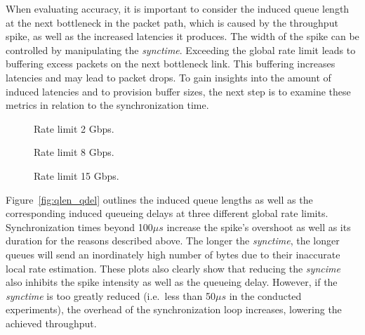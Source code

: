 %
When evaluating accuracy, it is important to consider the induced queue length at the next bottleneck in the packet path, which is caused by the throughput spike, as well as the increased latencies it produces.
%
The width of the spike can be controlled by manipulating the \textit{synctime}.
%
Exceeding the global rate limit leads to buffering excess packets on the next bottleneck link.
%
This buffering increases latencies and may lead to packet drops.
%
To gain insights into the amount of induced latencies and to provision buffer sizes, the next step is to examine these metrics in relation to the synchronization time. 
%
\begin{figure*}
    \begin{subfigure}{0.3\linewidth}
        \centering
        
        \caption{Rate limit 2 Gbps.}\label{fig:qlen_qdel_200us_2}
    \end{subfigure}
    \hfill
    \begin{subfigure}{0.3\linewidth}
        \centering
        
        \caption{Rate limit 8 Gbps.}\label{fig:qlen_qdel_200us_8}
    \end{subfigure}
    \hfill
    \begin{subfigure}{0.3\linewidth}
        \centering
        
        \caption{Rate limit 15 Gbps.}\label{fig:qlen_qdel_200us_15}
    \end{subfigure}
    \caption{Induced queue lengths and delays at varying \textit{synctimes} and at a configured global rate limit of 2, 8, and 15 Gbps}\label{fig:qlen_qdel}
\end{figure*}
Figure~\ref{fig:qlen_qdel} outlines the induced queue lengths as well as the corresponding induced queueing delays at three different global rate limits.
%
Synchronization times beyond 100$\mu s$ increase the spike's overshoot as well as its duration for the reasons described above.
%
The longer the \textit{synctime}, the longer queues will send an inordinately high number of bytes due to their inaccurate local rate estimation.
%
These plots also clearly show that reducing the \textit{syncime} also inhibits the spike intensity as well as the queueing delay.
%
However, if the \textit{synctime} is too greatly reduced (i.e.\ less than 50$\mu s$ in the conducted experiments), the overhead of the synchronization loop increases, lowering the achieved throughput.
